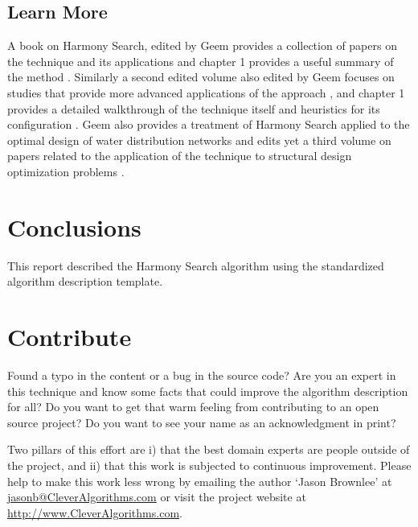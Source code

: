 \documentclass[a4paper, 11pt]{article}
\makeatletter
\newcommand{\myreportauthor}{Jason Brownlee}
\newcommand{\myreportemail}{jasonb@CleverAlgorithms.com}
\newcommand{\myreportwebsite}{http://www.CleverAlgorithms.com}
\makeatother
\begin{document}
% 
% 
\subsection{Learn More}
A book on Harmony Search, edited by Geem provides a collection of papers on the technique and its applications \cite{Geem2009} and chapter 1 provides a useful summary of the method \cite{Yang2009}. Similarly a second edited volume also edited by Geem focuses on studies that provide more advanced applications of the approach \cite{Geem2010}, and chapter 1 provides a detailed walkthrough of the technique itself and heuristics for its configuration \cite{Geem2010a}. Geem also provides a treatment of Harmony Search applied to the optimal design of water distribution networks \cite{Geem2009a} and edits yet a third volume on papers related to the application of the technique to structural design optimization problems \cite{Geem2009b}.

% 
% 
\section{Conclusions}
\label{sec:conclusions}
This report described the Harmony Search algorithm using the standardized algorithm description template.

% 
% 
\section{Contribute}
\label{sec:contribute}
Found a typo in the content or a bug in the source code? 
Are you an expert in this technique and know some facts that could improve the algorithm description for all?
Do you want to get that warm feeling from contributing to an open source project? 
Do you want to see your name as an acknowledgment in print?

Two pillars of this effort are i) that the best domain experts are people outside of the project, and ii) that this work is subjected to continuous improvement. 
Please help to make this work less wrong by emailing the author `\myreportauthor' at \url{\myreportemail} or visit the project website at \url{\myreportwebsite}.



\end{document}
